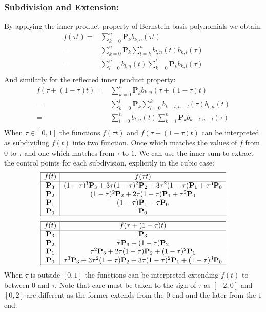 \subsubsection{Subdivision and Extension:}
By applying the inner product property of Bernstein basis polynomials we obtain:
\[\begin{aligned}
	f(\tau t) =& \sum_{k=0}^n\mathbf{P}_kb_{k,n}(\tau t)\\
	=&\sum_{k=0}^n\mathbf{P}_k\sum_{l=k}^nb_{l,n}(t)b_{k,l}(\tau)\\
	=&\sum_{l=0}^nb_{l,n}(t)\sum_{k=0}^l\mathbf{P}_kb_{k,l}(\tau)\\
\end{aligned}\]
And similarly for the reflected inner product property:
\[\begin{aligned}
	f(\tau +(1-\tau)t)=& \sum_{k=0}^n\mathbf{P}_kb_{k,n}(\tau+(1-\tau)t)\\
	=&\sum_{k=0}^l\mathbf{P}_k\sum_{l=0}^kb_{k-l,n-l}(\tau)b_{l,n}(t)\\
	=&\sum_{l=0}^nb_{l,n}(t)\sum_{k=l}^n\mathbf{P}_kb_{k-l,n-l}(\tau)\\
\end{aligned}\]
When $\tau\in[0,1]$ the functions $f(\tau t)$ and $f(\tau + (1-\tau)t)$ can be interpreted as subdividing $f(t)$ into two function.
Once which matches the values of $f$ from $0$ to $\tau$ and one which matches from $\tau$ to $1$.
We can use the inner sum to extract the control points for each subdivision,
explicitly in the cubic case:
\[\begin{array}{|c|c|}
	\hline
	f(t)&f(\tau t)\\
	\hline
	\mathbf{P}_3&(1-\tau)^3\mathbf{P}_3+3\tau(1-\tau)^2\mathbf{P}_2+3\tau^2(1-\tau)\mathbf{P}_1+\tau^3\mathbf{P}_0\\
	\mathbf{P}_2&(1-\tau)^2\mathbf{P}_2+2\tau(1-\tau)\mathbf{P}_1+\tau^2\mathbf{P}_0\\
	\mathbf{P}_1&(1-\tau)\mathbf{P}_1+\tau \mathbf{P}_0\\
	\mathbf{P}_0&\mathbf{P}_0\\
	\hline
\end{array}\]
\[\begin{array}{|c|c|}
	\hline
	f(t)&f(\tau+(1-\tau)t)\\
	\hline
	\mathbf{P}_3&\mathbf{P}_3\\
	\mathbf{P}_2&\tau \mathbf{P}_3+(1-\tau)\mathbf{P}_2\\
	\mathbf{P}_1&\tau^2\mathbf{P}_3+2\tau(1-\tau)\mathbf{P}_2+(1-\tau)^2\mathbf{P}_1\\
	\mathbf{P}_0&\tau^3\mathbf{P}_3+3\tau^2(1-\tau)\mathbf{P}_2+3\tau(1-\tau)^2\mathbf{P}_1+(1-\tau)^3\mathbf{P}_0\\
	\hline
\end{array}\]
When $\tau$ is outside $[0,1]$ the functions can be interpreted extending $f(t)$ to between $0$ and $\tau$.
Note that care must be taken to the sign of $\tau$ as $[-2,0]$ and $[0,2]$ are different as the former extends from the $0$ end and the later from the $1$ end.

